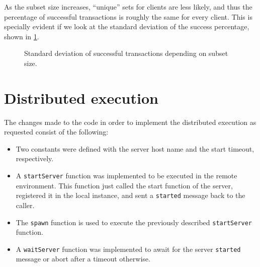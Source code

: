 \documentclass[a4paper, 10pt]{article}
\begin{document}
As the subset size increases, ``unique'' sets for clients are less likely, and thus the percentage of successful transactions is roughly the same for every client.
This is specially evident if we look at the standard deviation of the success percentage, shown in \cref{fig:stdv}.

\begin{figure}[htp]
\begin{center}
\caption{Standard deviation of successful transactions depending on subset size.}
\label{fig:stdv}
\end{center}
\end{figure}

\section{Distributed execution}

The changes made to the code in order to implement the distributed execution as requested consist of the following:
\begin{itemize}
\item Two constants were defined with the server host name and the start timeout, respectively.
\item A \texttt{startServer} function was implemented to be executed in the remote environment. This function just called the start function  of the server, registered it in the local instance, and sent a \texttt{started} message back to the caller.
\item The \texttt{spawn} function is used to execute the previously described \texttt{startServer} function.
\item A \texttt{waitServer} function was implemented  to await for the server \texttt{started} message or abort after a timeout otherwise.
\end{itemize}
\end{document}
